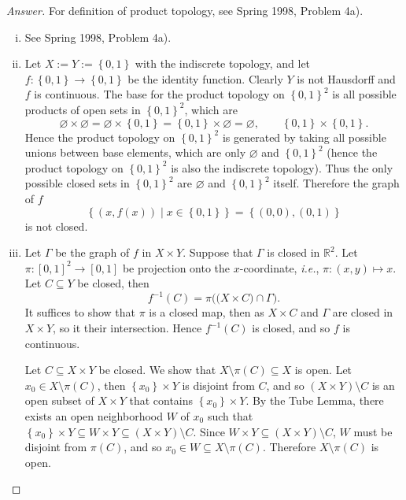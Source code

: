 \documentclass[12pt]{article}
\newcommand{\real}{\mathbb{R}}
\newcommand{\ita}[1]{\textit{#1}}
\newcommand\inv[1]{#1^{-1}}
\newcommand\setb[1]{\left \{ #1 \right \}}
\theoremstyle{definition}
\begin{document}
\begin{proof}[Answer]
    For definition of product topology, see Spring 1998, Problem 4a).
    \begin{enumerate}[(i)]
        \item See Spring 1998, Problem 4a).
        \item Let $X := Y := \setb{ 0 , 1 }$ with the indiscrete topology, and let $f : \setb{ 0 , 1 } \to \setb{ 0 , 1 }$ be the identity function. Clearly $Y$ is not Hausdorff and $f$ is continuous. The base for the product topology on $\setb{0,1}^2$ is all possible products of open sets in $\setb{0,1}^2$, which are 
        \[
            \varnothing \times \varnothing = \varnothing \times \setb{ 0 , 1 } = \setb{ 0 , 1 } \times \varnothing = \varnothing , \qquad \setb{ 0, 1} \times \setb{0,1}.
        \]
        Hence the product topology on $\setb{0,1}^2$ is generated by taking all possible unions between base elements, which are only $\varnothing$ and $\setb{0,1}^2$ (hence the product topology on $\setb{0,1}^2$ is also the indiscrete topology). Thus the only possible closed sets in $\setb{0,1}^2$ are $\varnothing$ and $\setb{0,1}^2$ itself. Therefore the graph of $f$
        \[
            \setb{ (x,f(x)) \mid x \in \setb{0,1} } = \setb{ (0,0) , (0,1) }
        \]
        is not closed.
        \item Let $\Gamma$ be the graph of $f$ in $X \times Y$. Suppose that $\Gamma$ is closed in $\real^2$. Let $\pi : [0,1]^2 \to [0,1]$ be projection onto the $x$-coordinate, \ita{i.e.}, $\pi : (x,y) \mapsto x$. Let $C \subseteq Y$ be closed, then 
        \[
            \inv{f}(C) = \pi \Big( \big( X \times C \big) \cap \Gamma \Big).
        \]
        It suffices to show that $\pi$ is a closed map, then as $X \times C$ and $\Gamma$ are closed in $X \times Y$, so it their intersection. Hence $\inv{f}(C)$ is closed, and so $f$ is continuous. 
        
        Let $C \subseteq X \times Y$ be closed. We show that $X \setminus \pi(C) \subseteq X$ is open. Let $x_0 \in X \setminus \pi(C)$, then $\setb{ x_0 } \times Y$ is disjoint from $C$, and so $(X \times Y) \setminus C$ is an open subset of $X \times Y$ that contains $\setb{ x_0 } \times Y$. By the Tube Lemma, there exists an open neighborhood $W$ of $x_0$ such that $\setb{ x_0 } \times Y \subseteq W \times Y \subseteq (X \times Y) \setminus C$. Since $W \times Y \subseteq (X \times Y) \setminus C$, $W$ must be disjoint from $\pi(C)$, and so $x_0 \in W \subseteq X \setminus \pi(C)$. Therefore $X \setminus \pi(C)$ is open.
    \end{enumerate}
\end{proof}
\end{document}
